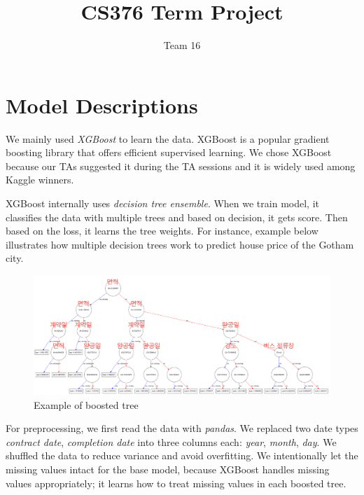 \documentclass{article}
\title{CS376 Term Project}
\author{Team 16}
\begin{document}
\maketitle

\section{Model Descriptions}


We mainly used \textit{XGBoost} to learn the data. XGBoost is a popular gradient boosting library that offers efficient supervised learning. We chose XGBoost because our TAs suggested it during the TA sessions and it is widely used among Kaggle winners.

XGBoost internally uses \textit{decision tree ensemble}. When we train model, it classifies the data with multiple trees and based on decision, it gets score. Then based on the loss, it learns the tree weights. For instance, example below illustrates how multiple decision trees work to predict house price of the Gotham city.

\begin{figure}[h]
\centering
\includegraphics[width=1\textwidth]{Depth5}
\caption{Example of boosted tree}
\end{figure}

For preprocessing, we first read the data with \textit{pandas}. We replaced two date types \textit{contract date}, \textit{completion date} into three columns each: \textit{year}, \textit{month}, \textit{day}. We shuffled the data to reduce variance and avoid overfitting. We intentionally let the missing values intact for the base model, because XGBoost handles missing values appropriately; it learns how to treat missing values in each boosted tree.
\end{document}
